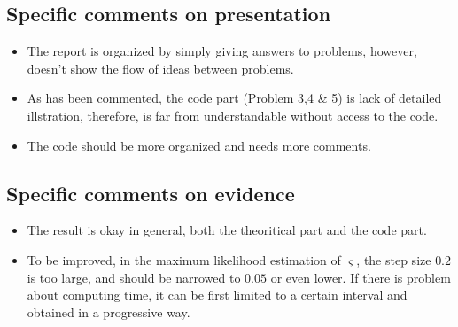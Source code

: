 \documentclass[11pt]{amsart}
\begin{document}
\subsection*{Specific comments on presentation}

\begin{itemize}
	\item The report is organized by simply giving answers to problems, however, doesn't show the flow of ideas between problems.
	\item As has been commented, the code part (Problem 3,4 \& 5) is lack of detailed illstration, therefore, is far from understandable without access to the code.
	\item The code should be more organized and needs more comments. 
\end{itemize}

\subsection*{Specific comments on evidence}

\begin{itemize}
	\item The result is okay in general, both the theoritical part and the code part.
	\item To be improved, in the maximum likelihood estimation of $\varsigma$, the step size $0.2$ is too large, and should be narrowed to $0.05$ or even lower. If there is problem about computing time, it can be first limited to a certain  interval and obtained in a progressive way.
\end{itemize}
\end{document}
